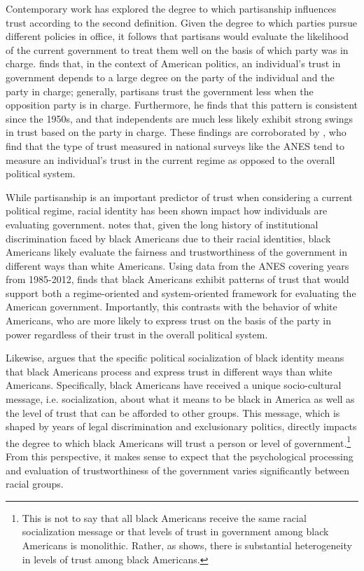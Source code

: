 \documentclass[12pt, letterpaper]{article}
\begin{document}
Contemporary work has explored the degree to which partisanship influences trust according to the second definition. Given the degree to which parties pursue different policies in office, it follows that partisans would evaluate the likelihood of the current government to treat them well on the basis of which party was in charge.  \citet{keele2005} finds that, in the context of American politics, an individual's trust in government depends to a large degree on the party of the individual and the party in charge; generally, partisans trust the government less when the opposition party is in charge. Furthermore, he finds that this pattern is consistent since the 1950s, and that independents are much less likely exhibit strong swings in trust based on the party in charge. These findings are corroborated by \citet{cook2005}, who find that the type of trust measured in national surveys like the ANES tend to measure an individual's trust in the current regime as opposed to the overall political system. 

While partisanship is an important predictor of trust when considering a current political regime, racial identity has been shown impact how individuals are evaluating government. \citet{wilkes2015} notes that, given the long history of institutional discrimination faced by black Americans due to their racial identities, black Americans likely evaluate the fairness and trustworthiness of the government in different ways than white Americans. Using data from the ANES covering years from 1985-2012, \citeauthor{wilkes} finds that black Americans exhibit patterns of trust that would support both a regime-oriented and system-oriented framework for evaluating the American government. Importantly, this contrasts with the behavior of white Americans, who are more likely to express trust on the basis of the party in power regardless of their trust in the overall political system.

Likewise, \citet{nunnally2012} argues that the specific political socialization of black identity means that black Americans process and express trust in different ways than white Americans. Specifically, black Americans have received a unique socio-cultural message, i.e. socialization, about what it means to be black in America as well as the level of trust that can be afforded to other groups. This message, which is shaped by years of legal discrimination and exclusionary politics, directly impacts the degree to which black Americans will trust a person or level of government.\footnote{This is not to say that all black Americans receive the same racial socialization message or that levels of trust in government among black Americans is monolithic. Rather, as \citeauthor{nunnally2012} shows, there is substantial heterogeneity in levels of trust among black Americans.} From this perspective, it makes sense to expect that the psychological processing and evaluation of trustworthiness of the government varies significantly between racial groups.
\end{document}
